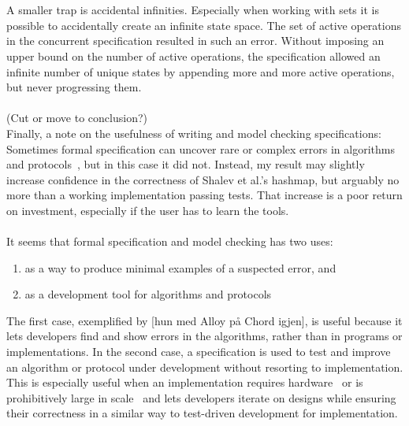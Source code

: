 \documentclass{uit-thesis}
\begin{document}
\\\\
A smaller trap is accidental infinities. Especially when working with sets it is possible to accidentally create an infinite state space. The set of active operations in the concurrent specification resulted in such an error. Without imposing an upper bound on the number of active operations, the specification allowed an infinite number of unique states by appending more and more active operations, but never progressing them.
\\\\
(Cut or move to conclusion?)\\
Finally, a note on the usefulness of writing and model checking specifications: Sometimes formal specification can uncover rare or complex errors in algorithms and protocols~\cite{Lund2019, hun som brukte Alloy?}, but in this case it did not. Instead, my result may slightly increase confidence in the correctness of Shalev et al.'s hashmap, but arguably no more than a working implementation passing tests. That increase is a poor return on investment, especially if the user has to learn the tools.
\\\\
It seems that formal specification and model checking has two uses:
\begin{enumerate}
    \item as a way to produce minimal examples of a suspected error, and \label{point:error}
    \item as a development tool for algorithms and protocols \label{point:dev}
\end{enumerate}
The first case, exemplified by [hun med Alloy på Chord igjen], is useful because it lets developers find and show errors in the algorithms, rather than in programs or implementations. In the second case, a specification is used to test and improve an algorithm or protocol under development without resorting to implementation. This is especially useful when an implementation requires hardware~\cite{Lamport-Batson2002} or is prohibitively large in scale~\cite{Amazon2015} and lets developers iterate on designs while ensuring their correctness in a similar way to test-driven development for implementation.
\\
\end{document}

